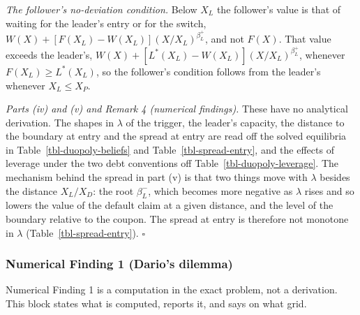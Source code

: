 \documentclass[
  11pt,
  letterpaper,
]{scrartcl}
\begin{document}
\emph{The follower's no-deviation condition.} Below \(X_L\) the
follower's value is that of waiting for the leader's entry or for the
switch, \(W(X) + [F(X_L) - W(X_L)](X/X_L)^{\beta_L^+}\), and not
\(F(X)\). That value exceeds the leader's,
\(W(X) + [L^*(X_L) - W(X_L)](X/X_L)^{\beta_L^+}\), whenever
\(F(X_L) \geq L^*(X_L)\), so the follower's condition follows from the
leader's whenever \(X_L \leq X_P\).

\emph{Parts (iv) and (v) and Remark 4 (numerical findings).} These have
no analytical derivation. The shapes in \(\lambda\) of the trigger, the
leader's capacity, the distance to the boundary at entry and the spread
at entry are read off the solved equilibria in
Table~\ref{tbl-duopoly-beliefs} and Table~\ref{tbl-spread-entry}, and
the effects of leverage under the two debt conventions off
Table~\ref{tbl-duopoly-leverage}. The mechanism behind the spread in
part (v) is that two things move with \(\lambda\) besides the distance
\(X_L/X_D\): the root \(\beta_L^-\), which becomes more negative as
\(\lambda\) rises and so lowers the value of the default claim at a
given distance, and the level of the boundary relative to the coupon.
The spread at entry is therefore not monotone in \(\lambda\)
(Table~\ref{tbl-spread-entry}). \(\square\)

\subsubsection*{Numerical Finding 1 (Dario's
dilemma)}\label{numerical-finding-1-darios-dilemma}

Numerical Finding 1 is a computation in the exact problem, not a
derivation. This block states what is computed, reports it, and says on
what grid.
\end{document}

